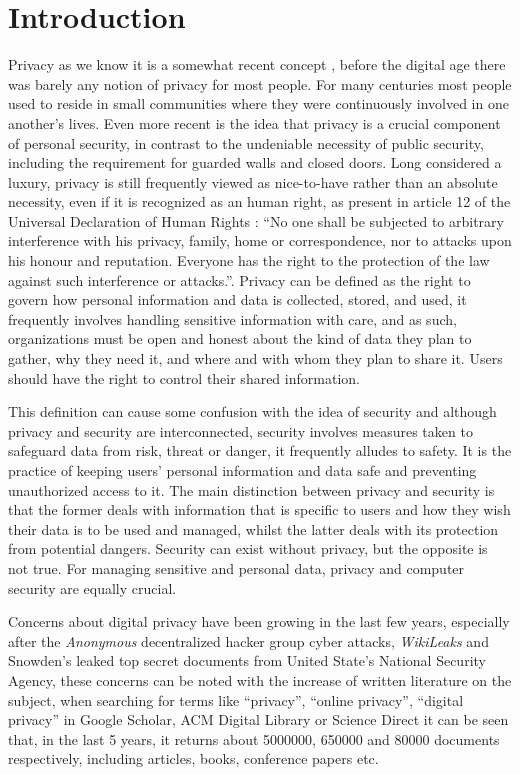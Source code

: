 \documentclass[conference]{IEEEtran}
\begin{document}
\section{Introduction}
Privacy as we know it is a somewhat recent concept \cite{vincent2016privacy, moore2017privacy},
before the digital age there was barely any notion of privacy for most people. For many centuries
most people used to reside in small communities where they were continuously involved in one
another's lives. Even more recent is the idea that privacy is a crucial component of
personal security, in contrast to the undeniable necessity of public security, including
the requirement for guarded walls and closed doors. Long considered a luxury, privacy is
still frequently viewed as nice-to-have rather than an absolute necessity, even if it is
recognized as an human right, as present in article 12 of the Universal Declaration of Human Rights
\cite{RooseveltUniversal}: ``No one shall be subjected to arbitrary interference with his privacy, family,
home or correspondence, nor to attacks upon his honour and reputation. Everyone has
the right to the protection of the law against such interference or attacks.''. Privacy can
be defined \cite{InternationalWhat, SpiekermannEngineering} as the right to govern
how personal information and data is collected, stored, and used, it frequently
involves handling sensitive information with care, and as such, organizations must
be open and honest about the kind of data they plan to gather, why they need it, and
where and with whom they plan to share it. Users should have the right to control their
shared information.

This definition can cause some confusion with the idea of
security \cite{HIVDifference} and although privacy and security are interconnected, security
involves measures taken to safeguard data from risk, threat or danger,
it frequently alludes to safety. It is the practice of keeping users'
personal information and data safe and preventing unauthorized access to it.
The main distinction between privacy and security is that the former deals with
information that is specific to users and how they wish their data is to
be used and managed, whilst the latter deals with its protection from
potential dangers. Security can exist without privacy,
but the opposite is not true. For managing sensitive and personal data, privacy and
computer security are equally crucial.

Concerns about digital privacy have been growing \cite{emami2019exploring, park2022personal, zhang2022peer} in the last few
years, especially after the \textit{Anonymous} decentralized hacker group
cyber attacks, \textit{WikiLeaks} and Snowden's leaked top secret documents from United State's
National Security Agency,
these concerns can be noted with the increase of written literature on the subject,
when searching for terms like ``privacy'', ``online privacy'',
``digital privacy'' in Google Scholar, ACM Digital Library or Science Direct it
can be seen that, in the last 5 years, it returns about 5000000, 650000 and 80000
documents respectively, including articles, books, conference papers etc.
\end{document}

